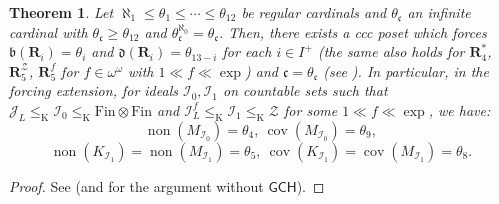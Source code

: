 \documentclass[a4paper,12pt]{amsart}
\newtheorem{thm}{Theorem}
\theoremstyle{definition}
\numberwithin{thm}{section}
\numberwithin{equation}{section}
\newcommand{\oo}{{\omega}^\omega}
\newcommand{\bb}{\mathfrak{b}}
\newcommand{\cc}{\mathfrak{c}}
\newcommand{\dd}{\mathfrak{d}}
\DeclareMathOperator{\non}{non}
\DeclareMathOperator{\cov}{cov}
\newcommand{\R}{\mathbf{R}}
\newcommand{\ind}{i}
\newcommand{\I}{\mathscr{I}}
\newcommand{\J}{\mathscr{J}}
\newcommand{\finfin}{\mathrm{Fin}\otimes\mathrm{Fin}}
\newcommand{\Z}{\mathcal{Z}}
\begin{document}
    \begin{thm}
	\label{thm:CM} 
			Let $\aleph_1\leq\theta_1\leq\cdots\leq\theta_{12}$ be regular cardinals and $\theta_\cc$ an infinite cardinal with $\theta_\cc\geq\theta_{12}$ and $\theta_\cc^{\aleph_0}=\theta_\cc$.
			Then, there exists a ccc poset which forces $\bb(\R_\ind)=\theta_\ind$ and $\dd(\R_\ind)=\theta_{13-\ind}$ for each $\ind\in I^+$ (the same also holds for $\R_4^*$, $\R_5^{\Z}$, $\R_5^f$ for $f\in\oo$ with $1\ll f\ll\exp$) and $\cc=\theta_\cc$ (see ).
            In particular, in the forcing extension, for ideals $\I_0, \I_1$ on countable sets such that $\J_L \leq_{\mathrm{K}} \I_0 \leq_{\mathrm{K}} \finfin$ and $\I_L^f \leq_{\mathrm{K}} \I_1 \leq_{\mathrm{K}} \Z$ for some $1\ll f\ll \exp$, we have:
        \[\non(M_{\I_0})=\theta_4,~\cov(M_{\I_0})=\theta_9,\]
        \[\non(K_{\I_1})=\non(M_{\I_1})=\theta_5,~\cov(K_{\I_1})=\cov(M_{\I_1})=\theta_8.\]
	\end{thm}
    \begin{proof}
        See \cite{GKMS22} (and \cite[Theorem 5.9]{Yam24} for the argument without $\mathsf{GCH}$).
    \end{proof}
\end{document}
